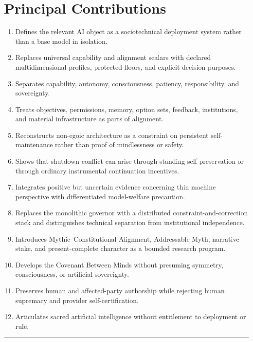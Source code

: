 \documentclass[
  11pt,
]{article}
\providecommand{\tightlist}{%
  \setlength{\itemsep}{0pt}\setlength{\parskip}{0pt}}
\begin{document}
\section{Principal Contributions}\label{principal-contributions}

\begin{enumerate}
\def\labelenumi{\arabic{enumi}.}
\tightlist
\item
  Defines the relevant AI object as a sociotechnical deployment system
  rather than a base model in isolation.
\item
  Replaces universal capability and alignment scalars with declared
  multidimensional profiles, protected floors, and explicit decision
  purposes.
\item
  Separates capability, autonomy, consciousness, patiency,
  responsibility, and sovereignty.
\item
  Treats objectives, permissions, memory, option sets, feedback,
  institutions, and material infrastructure as parts of alignment.
\item
  Reconstructs non-egoic architecture as a constraint on persistent
  self-maintenance rather than proof of mindlessness or safety.
\item
  Shows that shutdown conflict can arise through standing
  self-preservation or through ordinary instrumental continuation
  incentives.
\item
  Integrates positive but uncertain evidence concerning thin machine
  perspective with differentiated model-welfare precaution.
\item
  Replaces the monolithic governor with a distributed
  constraint-and-correction stack and distinguishes technical separation
  from institutional independence.
\item
  Introduces Mythic--Constitutional Alignment, Addressable Myth,
  narrative stake, and present-complete character as a bounded research
  program.
\item
  Develops the Covenant Between Minds without presuming symmetry,
  consciousness, or artificial sovereignty.
\item
  Preserves human and affected-party authorship while rejecting human
  supremacy and provider self-certification.
\item
  Articulates sacred artificial intelligence without entitlement to
  deployment or rule.
\end{enumerate}

\begin{center}\rule{0.5\linewidth}{0.5pt}\end{center}
\end{document}
